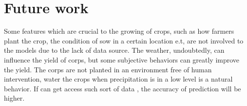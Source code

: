 \documentclass[conference]{IEEEtran}
\begin{document}
\section{Future work}
Some features which are crucial to the growing of crops, such as how farmers plant the crop, the condition of sow in a certain location e.t, are not involved to the models due to the lack of data source. The weather, undoubtedly, can influence the yield of corps, but some subjective behaviors can greatly improve the yield. The corps are not planted in an environment free of human intervention, water the crops when precipitation is in a low level is a natural behavior. If can get access such sort of data , the accuracy of prediction will be higher. 






\end{document}
